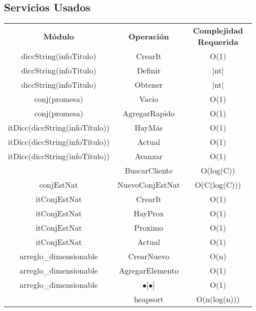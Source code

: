 \subsection{Servicios Usados}
\begin{center}
\begin{tabular*}{4\textwidth}{c |c | c }
\textbf{M\'odulo} & \textbf{Operaci\'on} & \textbf{Complejidad Requerida}\\
diccString(infoTitulo) & CrearIt & O(1)\\
diccString(infoTitulo) & Definir & |nt|\\
diccString(infoTitulo) & Obtener & |nt|\\
conj(promesa) & Vacio & O(1)\\
conj(promesa) & AgregarRapido & O(1)\\
itDicc(diccString(infoT\'itulo)) & HayM\'as & O(1)\\
itDicc(diccString(infoT\'itulo)) & Actual & O(1)\\
itDicc(diccString(infoT\'itulo)) & Avanzar & O(1)\\
& BuscarCliente & O(log(C))\\
conjEstNat & NuevoConjEstNat & O(C(log(C)))\\
itConjEstNat & CrearIt & O(1)\\
itConjEstNat & HayProx & O(1)\\
itConjEstNat & Proximo & O(1)\\
itConjEstNat & Actual & O(1)\\
arreglo\_dimensionable & CrearNuevo & O(n)\\
arreglo\_dimensionable & AgregarElemento & O(1)\\
arreglo\_dimensionable & $\bullet$[$\bullet$] & O(1)\\
& heapsort & O(n(log(n)))\\
\end{tabular*}
\end{center}
